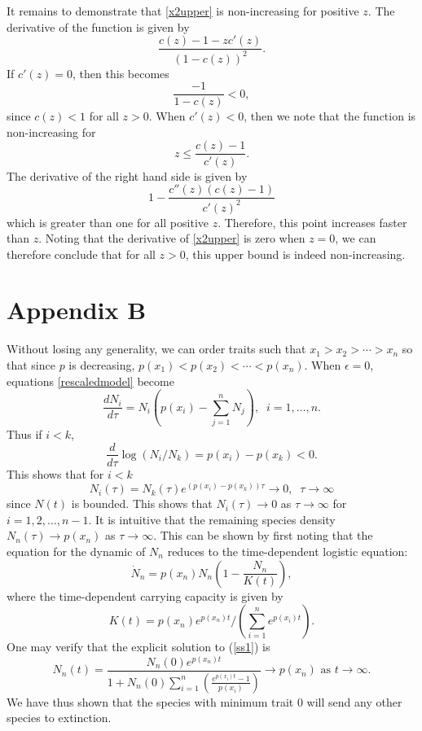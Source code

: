 It remains to demonstrate that \eqref{x2upper} is non-increasing for positive $z$. The derivative of the function is given by
\[
\frac{c(z)-1-zc'(z)}{(1-c(z))^2}.
\]
If $c'(z)=0$, then this becomes
\[
\frac{-1}{1-c(z)}<0, \]
since $c(z)<1$ for all $z>0$. When $c'(z)<0$, then we note that the function is non-increasing for 
\[
z\leq \frac{c(z)-1}{c'(z)}.
\]
The derivative of the right hand side is given by
\[
1-\frac{c''(z)(c(z)-1)}{c'(z)^2}
\]
which is greater than one for all positive $z$. Therefore, this point increases faster than $z$. Noting that the derivative of \eqref{x2upper} is zero when $z=0$, we can therefore conclude that for all $z>0$, this upper bound is indeed non-increasing.

\section*{Appendix B}
Without losing any generality, we can order traits such that $x_1>x_2 > \cdots > x_n$ so that since $p$ is decreasing, $p(x_1)< p(x_2) < \cdots < p(x_n)$. When $\epsilon=0$, equations \eqref{rescaledmodel} become
\[
\frac{d N_i}{d\tau}=N_i\left(p(x_i)-\sum_{j=1}^n N_{j}\right), \;\; i=1,\ldots,n.
\]
Thus if $i < k$,
\[
\frac{d}{d\tau} \log (N_i/N_k) = p(x_i)-p(x_k)<0.
\]
This shows that for $i<k$
\[
N_i(\tau) = N_k(\tau) e^{( p(x_i)-p(x_k)) \tau} \rightarrow 0, \;\; \tau\rightarrow \infty
\]
since $N(t)$ is bounded. This shows that $N_{i}(\tau)\rightarrow 0$ as $\tau\rightarrow \infty$ for $i=1,2,\ldots,n-1$. It is intuitive that the remaining species density $N_n(\tau) \rightarrow p(x_n)$ as $\tau\rightarrow \infty$. This can be shown by first noting that the equation for the dynamic of $N_n$ reduces to  the time-dependent logistic equation:
\begin{equation}
\dot{N}_n = p(x_n) N_n \left(1-\frac{N_n}{K(t)}\right), \label{ss1}
\end{equation}
where the time-dependent carrying capacity is given by 
\[
K(t) = p(x_n)e^{p(x_n)t}/(\sum_{i=1}^n e^{p(x_i)t}).
\] One may verify that the explicit solution to (\ref{ss1}) is
\[
N_n(t) = \frac{N_n(0) e^{p(x_n)t}}{1+N_n(0)\sum_{i=1}^n \left( \frac{e^{p(x_i)t}-1}{p(x_i)} \right)}\rightarrow p(x_n)\mbox{ as } t\rightarrow \infty.
\]
We have thus shown that the species with minimum trait $0$ will send any other species to extinction.

